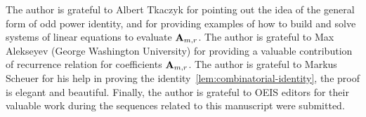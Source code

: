 The author is grateful to Albert Tkaczyk for pointing out the idea of the general form of odd power identity,
and for providing examples of how to build and solve systems of linear equations to evaluate ${\mathbf{A}} \sb{m,r}$.
The author is grateful to Max Alekseyev (George Washington University) for providing a valuable contribution
of recurrence relation for coefficients ${\mathbf{A}} \sb{m,r}$.
The author is grateful to Markus Scheuer for his help in proving the identity~\eqref{lem:combinatorial-identity},
the proof is elegant and beautiful.
Finally, the author is grateful to OEIS editors for their valuable work during the sequences
related to this manuscript were submitted.
